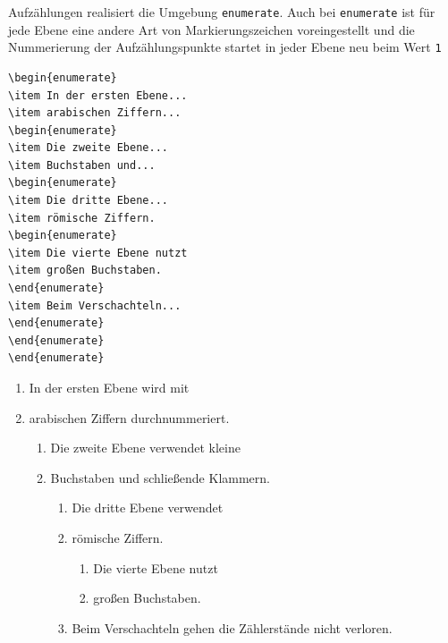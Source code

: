 \documentclass[a4paper,10pt,twoside]{scrbook}
\begin{document}
Aufzählungen realisiert die Umgebung \verb!enumerate!. Auch bei \verb!enumerate! ist für jede Ebene eine andere Art von Markierungszeichen voreingestellt und die Nummerierung der
Aufzählungspunkte startet in jeder Ebene neu beim Wert \verb!1!



\begin{minipage}[h]{0.44\textwidth}
\setlength{\parskip}{1em}
\frenchspacing
\begin{Verbatim}[frame=single]
\begin{enumerate}
\item In der ersten Ebene...
\item arabischen Ziffern...
\begin{enumerate}
\item Die zweite Ebene...
\item Buchstaben und...
\begin{enumerate}
\item Die dritte Ebene...
\item römische Ziffern.
\begin{enumerate}
\item Die vierte Ebene nutzt 
\item großen Buchstaben.
\end{enumerate}
\item Beim Verschachteln...
\end{enumerate}
\end{enumerate}
\end{enumerate}
\end{Verbatim}
\end{minipage}
\hfill
\begin{minipage}[h]{0.54\textwidth}
\setlength{\parskip}{1em}
\frenchspacing
\begin{enumerate}
\item In der ersten Ebene wird mit
\item arabischen Ziffern durchnummeriert.
\begin{enumerate}
\item Die zweite Ebene verwendet kleine
\item Buchstaben und schließende Klammern.
\begin{enumerate}
\item Die dritte Ebene verwendet
\item römische Ziffern.
\begin{enumerate}
\item Die vierte Ebene nutzt 
\item großen Buchstaben.
\end{enumerate}
\item Beim Verschachteln gehen die Zählerstände nicht verloren.
\end{enumerate}
\end{enumerate}
\end{enumerate}
\end{minipage}
\end{document}
